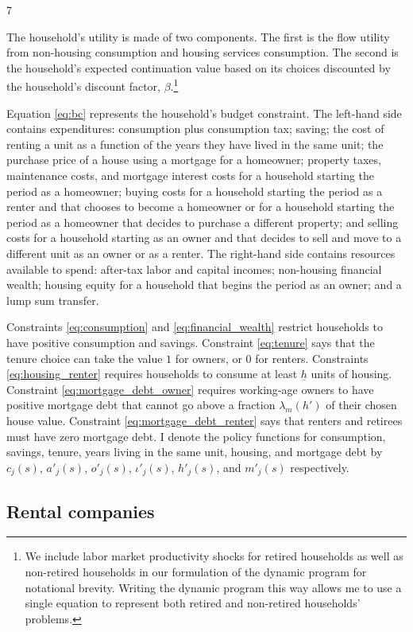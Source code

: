 7\documentclass[parskip=full]{article}
\begin{document}
The household's utility is made of two components. The first is the flow utility from non-housing consumption and housing services consumption. The second is the household's expected continuation value based on its choices discounted by the household's discount factor, $\beta$.\footnote{We include labor market productivity shocks for retired households as well as non-retired households in our formulation of the dynamic program for notational brevity. Writing the dynamic program this way allows me to use a single equation to represent both retired and non-retired households' problems.} 

Equation \ref{eq:bc} represents the household's budget constraint. The left-hand side contains expenditures: consumption plus consumption tax; saving; the cost of renting a unit as a function of the years they have lived in the same unit; the purchase price of a house using a mortgage for a homeowner; property taxes, maintenance costs, and mortgage interest costs for a household starting the period as a homeowner; buying costs for a household starting the period as a renter and that chooses to become a homeowner or for a household starting the period as a homeowner that decides to purchase a different property; and selling costs for a household starting as an owner and that decides to sell and move to a different unit as an owner or as a renter. The right-hand side contains resources available to spend: after-tax labor and capital incomes; non-housing financial wealth; housing equity for a household that begins the period as an owner; and a lump sum transfer. 

Constraints \ref{eq:consumption} and \ref{eq:financial_wealth} restrict households to have positive consumption and savings. Constraint \ref{eq:tenure} says that the tenure choice can take the value $1$ for owners, or $0$ for renters. Constraints \ref{eq:housing_renter} requires households to consume at least $\underline{h}$ units of housing. Constraint \ref{eq:mortgage_debt_owner} requires working-age owners to have positive mortgage debt that cannot go above a fraction $\lambda_{m}(h')$ of their chosen house value. Constraint \ref{eq:mortgage_debt_renter} says that renters and retirees must have zero mortgage debt. I denote the policy functions for consumption, savings, tenure, years living in the same unit, housing, and mortgage debt by $c_{j}(s)$, $a'_{j}(s)$, $o'_{j}(s)$, $\iota'_{j}(s)$, $h'_{j}(s)$, and $m'_{j}(s)$ respectively.

\subsection{Rental companies}
\end{document}
